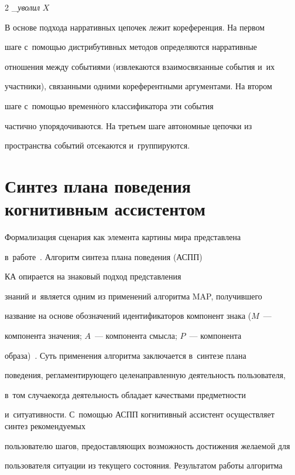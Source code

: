 \begin{multicols}{2}
\_\textit{уволил} $X$

    

    В основе подхода нарративных цепочек лежит кореференция. На первом 

шаге с~помощью дистрибутивных методов определяются нарративные 

отношения между событиями (извлекаются взаимосвязанные события и~их 

участники), связанными одними кореферентными аргументами. На втором 

шаге с~по\-мощью временн$\acute{\mbox{о}}$го классификатора эти события 

час\-тич\-но упорядочиваются. На третьем шаге автономные цепочки из 

про\-стран\-ст\-ва событий отсекаются и~группируются.



\section{Синтез плана поведения когнитивным ассистентом}



  Формализация сценария как элемента картины мира представлена 

в~работе~\cite{13-sm}. Алгоритм синтеза плана поведения (АСПП) 

КА опирается на знаковый подход пред\-став\-ле\-ния 

знаний и~является одним из применений алгоритма MAP, получившего 

название на основе обозначений идентификаторов компонент знака ($M$~--- 

компонента значения; $A$~--- компонента смыс\-ла; $P$~--- компонента 

образа)~\cite{14-sm}. Суть применения алгоритма за\-клю\-ча\-ет\-ся в~синтезе плана 

поведения, рег\-ла\-мен\-ти\-ру\-юще\-го це\-ле\-на\-прав\-лен\-ную де\-я\-тель\-ность пользователя, 

в~том случае\linebreak когда деятельность обладает качествами пред\-мет\-ности 

и~си\-ту\-а\-тив\-ности. С~по\-мощью АСПП когнитивный ассистент осуществляет синтез рекомендуемых 

пользователю шагов, пред\-остав\-ля\-ющих \mbox{воз\-мож\-ность} достижения же\-ла\-емой для 

пользователя ситуации из текущего со\-сто\-яния. Результатом работы алгоритма 


\end{multicols}
